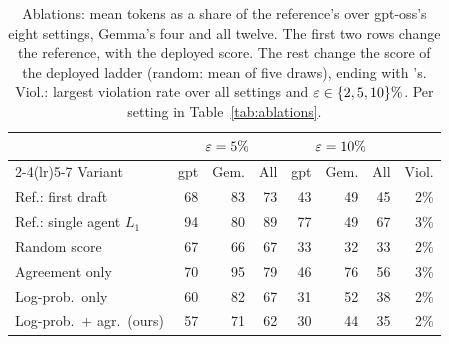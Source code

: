 \begin{table}[t]
\centering
\footnotesize
\setlength{\tabcolsep}{2.3pt}
\begin{tabular}{@{}lrrrrrrr@{}}
\toprule
 & \multicolumn{3}{c}{$\varepsilon = 5\%$} & \multicolumn{3}{c}{$\varepsilon = 10\%$} & \\
\cmidrule(lr){2-4}\cmidrule(lr){5-7}
Variant & gpt & Gem. & All & gpt & Gem. & All & Viol. \\
\midrule
Ref.: first draft & 68 & 83 & 73 & 43 & 49 & 45 & 2\% \\
Ref.: single agent $L_1$ & 94 & 80 & 89 & 77 & 49 & 67 & 3\% \\
\midrule
Random score & 67 & 66 & 67 & 33 & 32 & 33 & 2\% \\
Agreement only & 70 & 95 & 79 & 46 & 76 & 56 & 3\% \\
Log-prob.\ only & 60 & 82 & 67 & 31 & 52 & 38 & 2\% \\
Log-prob.\ + agr.\ (ours) & 57 & 71 & 62 & 30 & 44 & 35 & 2\% \\
\bottomrule
\end{tabular}
\caption{Ablations: mean tokens as a share of the reference's over gpt-oss's eight settings, Gemma's four and all twelve. The first two rows change the reference, with the deployed score. The rest change the score of the deployed ladder (random: mean of five draws), ending with \climb{}'s. Viol.: largest violation rate over all settings and $\varepsilon \in \{2, 5, 10\}\%$. Per setting in Table~\ref{tab:ablations}.}
\label{tab:ablmain}
\end{table}

